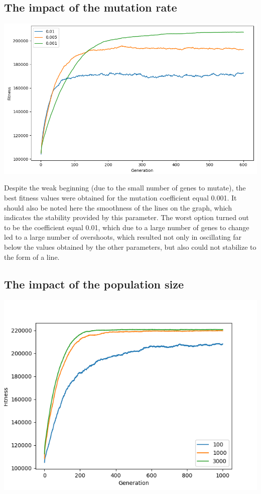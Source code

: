 \documentclass[12pt]{article}
\begin{document}
\subsection{The impact of the mutation rate}
\hspace*{-1.5cm}
\includegraphics[scale=0.55]{mutation}

Despite the weak beginning (due to the small number of genes to mutate), the best fitness values were obtained for the mutation coefficient equal 0.001. It should also be noted here the smoothness of the lines on the graph, which indicates the stability provided by this parameter. The worst option turned out to be the coefficient equal 0.01, which due to a large number of genes to change led to a large number of overshoots, which resulted not only in oscillating far below the values obtained by the other parameters, but also could not stabilize to the form of a line.

\subsection{The impact of the population size}
\hspace*{-1.0cm}
\includegraphics[scale=0.95]{population}
\end{document}
